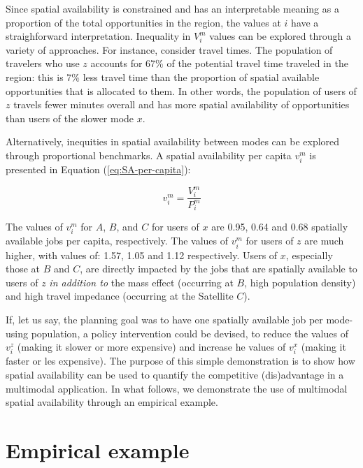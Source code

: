 \documentclass[10pt,letterpaper]{article}
\begin{document}
Since spatial availability is constrained and has an interpretable
meaning as a proportion of the total opportunities in the region, the
values at \(i\) have a straighforward interpretation. Inequality in
\(V_i^m\) values can be explored through a variety of approaches. For
instance, consider travel times. The population of travelers who use
\(z\) accounts for 67\% of the potential travel time traveled in the
region: this is 7\% less travel time than the proportion of spatial
available opportunities that is allocated to them. In other words, the
population of users of \(z\) travels fewer minutes overall and has more
spatial availability of opportunities than users of the slower mode
\(x\).

Alternatively, inequities in spatial availability between modes can be
explored through proportional benchmarks. A spatial availability per
capita \(v_i^m\) is presented in Equation (\ref{eq:SA-per-capita}):

\begin{equation}
\label{eq:SA-per-capita}
v_{i}^m = \frac{V_{i}^m}{P_{i}^m}
\end{equation}

The values of \(v_i^m\) for \(A\), \(B\), and \(C\) for users of \(x\)
are 0.95, 0.64 and 0.68 spatially available jobs per capita,
respectively. The values of \(v_i^m\) for users of \(z\) are much
higher, with values of: 1.57, 1.05 and 1.12 respectively. Users of
\(x\), especially those at \(B\) and \(C\), are directly impacted by the
jobs that are spatially available to users of \(z\) \emph{in addition
to} the mass effect (occurring at \(B\), high population density) and
high travel impedance (occurring at the Satellite \(C\)).

If, let us say, the planning goal was to have one spatially available
job per mode-using population, a policy intervention could be devised,
to reduce the values of \(v_i^z\) (making it slower or more expensive)
and increase he values of \(v_i^x\) (making it faster or les expensive).
The purpose of this simple demonstration is to show how spatial
availability can be used to quantify the competitive (dis)advantage in a
multimodal application. In what follows, we demonstrate the use of
multimodal spatial availability through an empirical example.

\hypertarget{empirical-example}{%
\section{Empirical example}\label{empirical-example}}
\end{document}
